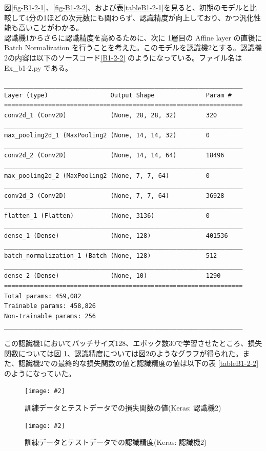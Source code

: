 \documentclass[a4paper,dvipdfmx]{jsarticle}
\newcommand{\image}[3]{
    \begin{figure}[H]
        \begin{center}
        \texttt{[image: \#2]}
        \end{center}
        \caption{#1}
        \label{#3}
    \end{figure}
}
\begin{document}
図\ref{fig-B1-2-1}、\ref{fig-B1-2-2}、および表\ref{tableB1-2-1}を見ると、初期のモデルと比較して4分の1ほどの次元数にも関わらず、認識精度が向上しており、かつ汎化性能も高いことがわかる。\\

認識機1からさらに認識精度を高めるために、次に 1層目の Affine layer の直後に Batch Normalization を行うことを考えた。このモデルを認識機2とする。認識機2の内容は以下のソースコード\ref{B1-2-2} のようになっている。ファイル名は Ex\_b1-2.py である。

\begin{lstlisting}[caption="作成した認識機その2",label=B1-2-2]
_________________________________________________________________
Layer (type)                 Output Shape              Param #
=================================================================
conv2d_1 (Conv2D)            (None, 28, 28, 32)        320
_________________________________________________________________
max_pooling2d_1 (MaxPooling2 (None, 14, 14, 32)        0
_________________________________________________________________
conv2d_2 (Conv2D)            (None, 14, 14, 64)        18496
_________________________________________________________________
max_pooling2d_2 (MaxPooling2 (None, 7, 7, 64)          0
_________________________________________________________________
conv2d_3 (Conv2D)            (None, 7, 7, 64)          36928
_________________________________________________________________
flatten_1 (Flatten)          (None, 3136)              0
_________________________________________________________________
dense_1 (Dense)              (None, 128)               401536
_________________________________________________________________
batch_normalization_1 (Batch (None, 128)               512
_________________________________________________________________
dense_2 (Dense)              (None, 10)                1290
=================================================================
Total params: 459,082
Trainable params: 458,826
Non-trainable params: 256
_________________________________________________________________
\end{lstlisting}

この認識機1においてバッチサイズ128、エポック数30で学習させたところ、損失関数については図 \ref{fig-B1-2-3}、認識精度については図\ref{fig-B1-2-4}のようなグラフが得られた。また、認識機2での最終的な損失関数の値と認識精度の値は以下の表 \ref{tableB1-2-2} のようになっていた。

\image{訓練データとテストデータでの損失関数の値(Keras: 認識機2)}{report_b1-2-3.png}{fig-B1-2-3}
\image{訓練データとテストデータでの認識精度(Keras: 認識機2)}{report_b1-2-4.png}{fig-B1-2-4}
\end{document}

